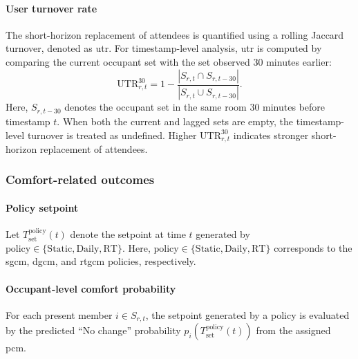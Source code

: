 \paragraph{User turnover rate}
The short-horizon replacement of attendees is quantified using a rolling Jaccard turnover, denoted as \ac{utr}.
For timestamp-level analysis, \ac{utr} is computed by comparing the current occupant set with the set observed 30 minutes earlier:
\begin{equation}
\mathrm{UTR}_{r,t}^{30}
=
1
-
\frac{
|S_{r,t}\cap S_{r,t-30}|
}{
|S_{r,t}\cup S_{r,t-30}|
}.
\label{eq:rolling_turnover}
\end{equation}
Here, $S_{r,t-30}$ denotes the occupant set in the same room 30 minutes before timestamp $t$.
When both the current and lagged sets are empty, the timestamp-level turnover is treated as undefined.
Higher $\mathrm{UTR}_{r,t}^{30}$ indicates stronger short-horizon replacement of attendees.



\subsubsection{Comfort-related outcomes}
\label{subsec:comfMetrics}

\paragraph{Policy setpoint}
Let $T_{\mathrm{set}}^{\mathrm{policy}}(t)$ denote the setpoint at time $t$ generated by $\mathrm{policy}\in\{\mathrm{Static},\mathrm{Daily},\mathrm{RT}\}$.
Here, $\mathrm{policy}\in\{\mathrm{Static},\mathrm{Daily},\mathrm{RT}\}$ corresponds to the \ac{sgcm}, \ac{dgcm}, and \ac{rtgcm} policies, respectively.

\paragraph{Occupant-level comfort probability}
For each present member $i\in S_{r,t}$, the setpoint generated by a policy is evaluated by the predicted ``No change'' probability $p_i(T_{\mathrm{set}}^{\mathrm{policy}}(t))$ from the assigned \ac{pcm}.

